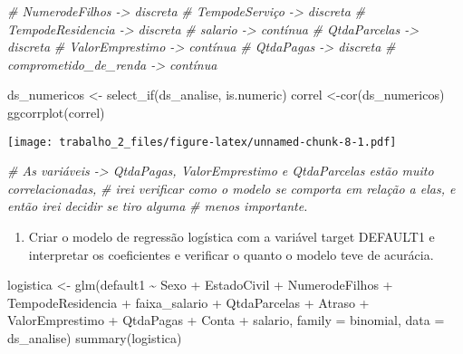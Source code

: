 \documentclass[
]{article}
\newenvironment{Shaded}{\begin{snugshade}}{\end{snugshade}}
\newcommand{\AttributeTok}[1]{\textcolor[rgb]{0.77,0.63,0.00}{#1}}
\newcommand{\CommentTok}[1]{\textcolor[rgb]{0.56,0.35,0.01}{\textit{#1}}}
\newcommand{\FunctionTok}[1]{\textcolor[rgb]{0.00,0.00,0.00}{#1}}
\newcommand{\NormalTok}[1]{#1}
\newcommand{\OtherTok}[1]{\textcolor[rgb]{0.56,0.35,0.01}{#1}}
\newcommand{\SpecialCharTok}[1]{\textcolor[rgb]{0.00,0.00,0.00}{#1}}
\providecommand{\tightlist}{%
  \setlength{\itemsep}{0pt}\setlength{\parskip}{0pt}}
\begin{document}
\begin{Shaded}
\begin{Highlighting}[]
\CommentTok{\# NumerodeFilhos {-}\textgreater{} discreta}
\CommentTok{\# TempodeServiço {-}\textgreater{} discreta}
\CommentTok{\# TempodeResidencia {-}\textgreater{} discreta}
\CommentTok{\# salario {-}\textgreater{} contínua}
\CommentTok{\# QtdaParcelas {-}\textgreater{} discreta}
\CommentTok{\# ValorEmprestimo {-}\textgreater{} contínua}
\CommentTok{\# QtdaPagas {-}\textgreater{} discreta}
\CommentTok{\# comprometido\_de\_renda {-}\textgreater{} contínua}

\NormalTok{ds\_numericos }\OtherTok{\textless{}{-}} \FunctionTok{select\_if}\NormalTok{(ds\_analise, is.numeric)}
\NormalTok{correl }\OtherTok{\textless{}{-}}\FunctionTok{cor}\NormalTok{(ds\_numericos)}
\FunctionTok{ggcorrplot}\NormalTok{(correl)}
\end{Highlighting}
\end{Shaded}

\texttt{[image: trabalho\_2\_files/figure-latex/unnamed-chunk-8-1.pdf]}

\begin{Shaded}
\begin{Highlighting}[]
\CommentTok{\# As variáveis {-}\textgreater{} QtdaPagas, ValorEmprestimo e QtdaParcelas estão muito correlacionadas,}
\CommentTok{\# irei verificar como o modelo se comporta em relação a elas, e então irei decidir se tiro alguma}
\CommentTok{\# menos importante.}
\end{Highlighting}
\end{Shaded}

\begin{enumerate}
\def\labelenumi{\Alph{enumi})}
\tightlist
\item
  Criar o modelo de regressão logística com a variável target DEFAULT1 e
  interpretar os coeficientes e verificar o quanto o modelo teve de
  acurácia.
\end{enumerate}

\begin{Shaded}
\begin{Highlighting}[]
\NormalTok{logistica }\OtherTok{\textless{}{-}} \FunctionTok{glm}\NormalTok{(default1 }\SpecialCharTok{\textasciitilde{}}\NormalTok{ Sexo }\SpecialCharTok{+}\NormalTok{ EstadoCivil }\SpecialCharTok{+}\NormalTok{ NumerodeFilhos }\SpecialCharTok{+}\NormalTok{ TempodeResidencia }\SpecialCharTok{+}
\NormalTok{                    faixa\_salario }\SpecialCharTok{+}\NormalTok{ QtdaParcelas }\SpecialCharTok{+}\NormalTok{ Atraso }\SpecialCharTok{+}\NormalTok{ ValorEmprestimo }\SpecialCharTok{+}
\NormalTok{                   QtdaPagas }\SpecialCharTok{+}\NormalTok{ Conta }\SpecialCharTok{+}\NormalTok{ salario, }\AttributeTok{family =}\NormalTok{ binomial, }\AttributeTok{data =}\NormalTok{ ds\_analise)}
\FunctionTok{summary}\NormalTok{(logistica)}
\end{Highlighting}
\end{Shaded}
\end{document}
